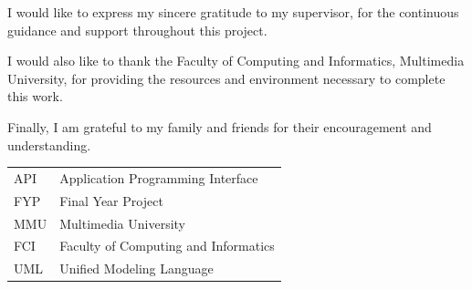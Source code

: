 \documentclass[
]{fypStandard}
\author{}
\date{}
\renewcommand*\contentsname{Table of contents}
\newcommand\contentsname{Table of contents}
\begin{document}

\makecoverpage

\maketitlepage

\frontmatteraliased

\makecopyrightpage

\makedeclarationpage

\begin{acknowledgements}
I would like to express my sincere gratitude to my supervisor,
for the continuous guidance and support throughout this project.

I would also like to thank the Faculty of Computing and Informatics,
Multimedia University, for providing the resources and environment
necessary to complete this work.

Finally, I am grateful to my family and friends for their
encouragement and understanding.
\end{acknowledgements}

\begin{abstract}
Write your abstract here. In one page, certainly not more than two,
summarize the main features of your project; describe what problem
you are solving and how you propose to solve it. This brief overview
should give a snapshot of the overall structure of your final year
project.
\end{abstract}

\renewcommand*\contentsname{TABLE OF CONTENTS}
{
\hypersetup{linkcolor=black}
\setcounter{tocdepth}{3}
\tableofcontents
}

\listoftables

\listoffigures

\begin{listofabbreviations}
\begin{tabular}{@{}ll@{}}
API   & Application Programming Interface \\
FYP   & Final Year Project \\
MMU   & Multimedia University \\
FCI   & Faculty of Computing and Informatics \\
UML   & Unified Modeling Language \\
\end{tabular}
\end{listofabbreviations}
\end{document}
